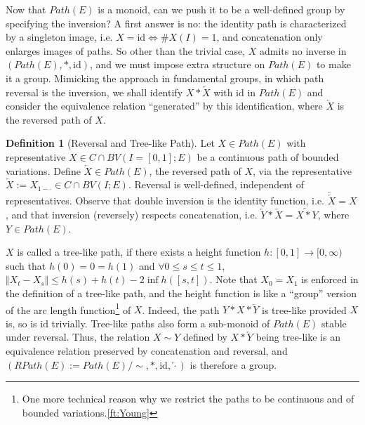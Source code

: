 \documentclass[fleqn]{article}
\theoremstyle{definition}
\newtheorem{defn}[thm]{Definition}
\theoremstyle{remark}
\newcommand{\id}{\mathrm{id}} %
\begin{document}
\par
Now that $Path(E)$ is a monoid, can we push it to be a well-defined group by specifying the inversion? A first answer is no: the identity path is characterized by a singleton image, i.e. $X=\id \Leftrightarrow \#X(I)=1$, and concatenation only enlarges images of paths. So other than the trivial case, $X$ admits no inverse in $\left(Path(E),*,\id\right)$, and we must impose extra structure on $Path(E)$ to make it a group. Mimicking the approach in fundamental groups, in which path reversal is the inversion, we shall identify $X*\overleftarrow{X}$ with $\id$ in $Path(E)$ and consider the equivalence relation ``generated'' by this identification, where $\overleftarrow{X}$ is the reversed path of $X$.

\begin{defn}[Reversal and Tree-like Path]
Let $X\in Path(E)$ with representative $X\in C\cap BV(I=[0,1];E)$ be a continuous path of bounded variations. Define $\overleftarrow{X}\in Path(E)$, the reversed path of $X$, via the representative $\overleftarrow{X}:=X_{1-\cdot} \in C\cap BV(I;E)$. Reversal is well-defined, independent of representatives. Observe that double inversion is the identity function, i.e. $\overleftarrow{\overleftarrow{X}}=X$, and that inversion (reversely) respects concatenation, i.e. $\overleftarrow{Y}*\overleftarrow{X} = \overleftarrow{X*Y}$, where $Y\in Path(E)$.

\par
$X$ is called a tree-like path, if there exists a height function $h:[0,1]\to[0,\infty)$ such that $h(0)=0=h(1)$ and $\forall 0\le s\le t\le 1$, $\Vert X_t-X_s\Vert \le h(s)+h(t)-2\inf h([s,t])$. Note that $X_0=X_1$ is enforced in the definition of a tree-like path, and the height function is like a ``group'' version of the arc length function\footnote{One more technical reason why we restrict the paths to be continuous and of bounded variations.\ref{ft:Young}} of $X$. Indeed, the path $Y*X*\overleftarrow{Y}$ is tree-like provided $X$ is, so is $\id$ trivially. Tree-like paths also form a sub-monoid of $Path(E)$ stable under reversal. Thus, the relation $X\sim Y$ defined by $X*\overleftarrow{Y}$ being tree-like is an equivalence relation preserved by concatenation and reversal, and $\left(RPath(E):=Path(E)/\sim,*,\id,\overleftarrow{\cdot}\right)$ is therefore a group.
\end{defn}
\end{document}

